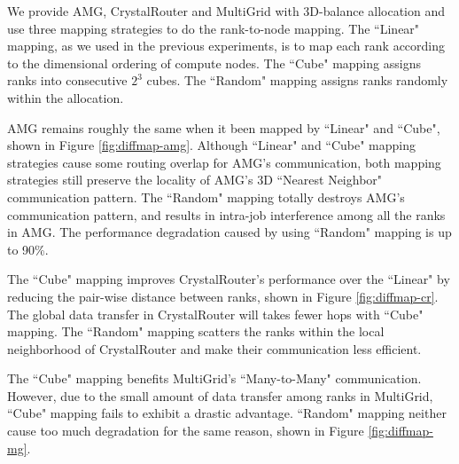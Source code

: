 We provide AMG, CrystalRouter and MultiGrid with 3D-balance allocation and use three mapping strategies to do the rank-to-node mapping. The ``Linear" mapping, as we used in the previous experiments, is to map each rank according to the dimensional ordering of compute nodes. The ``Cube" mapping assigns ranks into consecutive $2^{3}$ cubes. The ``Random" mapping assigns ranks randomly within the allocation. 

AMG remains roughly the same when it been mapped by ``Linear" and ``Cube", shown in Figure \ref{fig:diffmap-amg}. Although ``Linear" and ``Cube" mapping strategies cause some routing overlap for AMG's communication, both mapping strategies still preserve the locality of AMG's 3D ``Nearest Neighbor" communication pattern. The ``Random" mapping totally destroys AMG's communication pattern, and results in intra-job interference among all the ranks in AMG. The performance degradation caused by using ``Random" mapping is up to 90\%.

The ``Cube" mapping improves CrystalRouter's performance over the ``Linear" by reducing the pair-wise distance between ranks, shown in Figure \ref{fig:diffmap-cr}. The global data transfer in CrystalRouter will takes fewer hops with ``Cube" mapping. The ``Random" mapping scatters the ranks within the local neighborhood of CrystalRouter and make their communication less efficient. 


The ``Cube" mapping benefits MultiGrid's ``Many-to-Many" communication. However, due to the small amount of data transfer among ranks in MultiGrid, ``Cube" mapping fails to exhibit a drastic advantage. ``Random" mapping neither cause too much degradation for the same reason, shown in Figure \ref{fig:diffmap-mg}.


